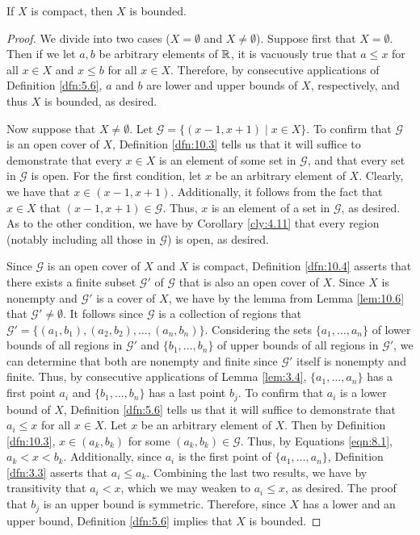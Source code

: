 \documentclass[../main.tex]{subfiles}
\begin{document}
\begin{theorem}\label{trm:10.9}
    If $X$ is compact, then $X$ is bounded.
    \begin{proof}
        We divide into two cases ($X=\emptyset$ and $X\neq\emptyset$). Suppose first that $X=\emptyset$. Then if we let $a,b$ be arbitrary elements of $\mathbb{R}$, it is vacuously true that $a\leq x$ for all $x\in X$ and $x\leq b$ for all $x\in X$. Therefore, by consecutive applications of Definition \ref{dfn:5.6}, $a$ and $b$ are lower and upper bounds of $X$, respectively, and thus $X$ is bounded, as desired.\par
        Now suppose that $X\neq\emptyset$. Let $\mathcal{G}=\{(x-1,x+1)\mid x\in X\}$. To confirm that $\mathcal{G}$ is an open cover of $X$, Definition \ref{dfn:10.3} tells us that it will suffice to demonstrate that every $x\in X$ is an element of some set in $\mathcal{G}$, and that every set in $\mathcal{G}$ is open. For the first condition, let $x$ be an arbitrary element of $X$. Clearly, we have that $x\in(x-1,x+1)$. Additionally, it follows from the fact that $x\in X$ that $(x-1,x+1)\in\mathcal{G}$. Thus, $x$ is an element of a set in $\mathcal{G}$, as desired. As to the other condition, we have by Corollary \ref{cly:4.11} that every region (notably including all those in $\mathcal{G}$) is open, as desired.\par
        Since $\mathcal{G}$ is an open cover of $X$ and $X$ is compact, Definition \ref{dfn:10.4} asserts that there exists a finite subset $\mathcal{G}'$ of $\mathcal{G}$ that is also an open cover of $X$. Since $X$ is nonempty and $\mathcal{G}'$ is a cover of $X$, we have by the lemma from Lemma \ref{lem:10.6} that $\mathcal{G}'\neq\emptyset$. It follows since $\mathcal{G}$ is a collection of regions that $\mathcal{G}'=\{(a_1,b_1),(a_2,b_2),\dots,(a_n,b_n)\}$. Considering the sets $\{a_1,\dots,a_n\}$ of lower bounds of all regions in $\mathcal{G}'$ and $\{b_1,\dots,b_n\}$ of upper bounds of all regions in $\mathcal{G}'$, we can determine that both are nonempty and finite since $\mathcal{G}'$ itself is nonempty and finite. Thus, by consecutive applications of Lemma \ref{lem:3.4}, $\{a_1,\dots,a_n\}$ has a first point $a_i$ and $\{b_1,\dots,b_n\}$ has a last point $b_j$. To confirm that $a_i$ is a lower bound of $X$, Definition \ref{dfn:5.6} tells us that it will suffice to demonstrate that $a_i\leq x$ for all $x\in X$. Let $x$ be an arbitrary element of $X$. Then by Definition \ref{dfn:10.3}, $x\in(a_k,b_k)$ for some $(a_k,b_k)\in\mathcal{G}$. Thus, by Equations \ref{eqn:8.1}, $a_k<x<b_k$. Additionally, since $a_i$ is the first point of $\{a_1,\dots,a_n\}$, Definition \ref{dfn:3.3} asserts that $a_i\leq a_k$. Combining the last two results, we have by transitivity that $a_i<x$, which we may weaken to $a_i\leq x$, as desired. The proof that $b_j$ is an upper bound is symmetric. Therefore, since $X$ has a lower and an upper bound, Definition \ref{dfn:5.6} implies that $X$ is bounded.
    \end{proof}
\end{theorem}
\end{document}
